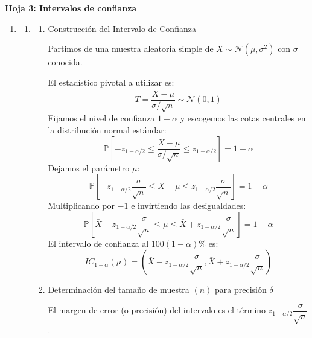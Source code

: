 \begin{center}
	\Large \textbf{Hoja 3: Intervalos de confianza}
\end{center}

\begin{enumerate}[label=\color{red}\textbf{\arabic*)}]
	\item {}
	      \begin{enumerate}[label=\color{red}\textbf{\alph*)}]
		      \item {}
		            \begin{enumerate}[label=\arabic*)]
			            \item Construcción del Intervalo de Confianza

			                  Partimos de una muestra aleatoria simple de $X\sim \mathcal{N}(\mu,\sigma^2)$ con $\sigma$ conocida.

			                  El estadístico pivotal a utilizar es: \[
				                  T=\dfrac{\bar{X}-\mu}{\sigma / \sqrt{n} }\sim \mathcal{N}(0,1)
			                  \]
			                  Fijamos el nivel de confianza $1-\alpha$ y escogemos las cotas centrales en la distribución normal estándar: \[
				                  \mathbb{P}\left[ -z_{1-\alpha / 2}\le \dfrac{\bar{X}-\mu}{\sigma /\sqrt{n} } \le z_{1-\alpha / 2} \right]=1-\alpha
			                  \]
			                  Dejamos el parámetro $\mu$: \[
				                  \mathbb{P}\left[ -z_{1-\alpha / 2} \dfrac{\sigma}{\sqrt{n}}\le \bar{X}-\mu\le z_{1-\alpha / 2} \dfrac{\sigma}{\sqrt{n} } \right] =1-\alpha
			                  \]
			                  Multiplicando por $-1$ e invirtiendo las desigualdades: \[
				                  \mathbb{P}\left[ \bar{X}-z_{1-\alpha / 2} \dfrac{\sigma}{\sqrt{n} }\le \mu\le \bar{X}+z_{1-\alpha / 2} \dfrac{\sigma}{\sqrt{n} }\right] =1-\alpha
			                  \]
			                  El intervalo de confianza al $100(1-\alpha)\%$ es: \[
				                  IC_{1-\alpha}(\mu)=\left( \bar{X}-z_{1-\alpha / 2} \dfrac{\sigma}{\sqrt{n} }, \bar{X}+z_{1-\alpha / 2} \dfrac{\sigma}{\sqrt{n} }\right)
			                  \]
			            \item Determinación del tamaño de muestra $(n)$ para precisión $\delta$

			                  El margen de error (o precisión) del intervalo es el término $z_{1-\alpha / 2} \dfrac{\sigma}{\sqrt{n} }$.


\end{enumerate}
\end{enumerate}
\end{enumerate}
